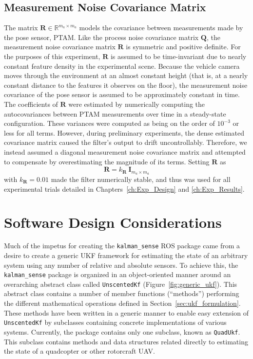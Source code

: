 \subsection{Measurement Noise Covariance Matrix} \label{sec:R_Matrix}

The matrix $\mathbf{R} \in \mathbb{R}^{m_{a} \times m_{a}}$ models the covariance between measurements made by the pose sensor, PTAM. Like the process noise covariance matrix $\mathbf{Q}$, the measurement noise covariance matrix $\mathbf{R}$ is symmetric and positive definite. For the purposes of this experiment, $\mathbf{R}$ is assumed to be time-invariant due to nearly constant feature density in the experimental scene. Because the vehicle camera moves through the environment at an almost constant height (that is, at a nearly constant distance to the features it observes on the floor), the measurement noise covariance of the pose sensor is assumed to be approximately constant in time. The coefficients of $\mathbf{R}$ were estimated by numerically computing the autocovariances between PTAM measurements over time in a steady-state configuration. These variances were computed as being on the order of $10^{-3}$ or less for all terms. However, during preliminary experiments, the dense estimated covariance matrix caused the filter's output to drift uncontrollably. Therefore, we instead assumed a diagonal measurement noise covariance matrix and attempted to compensate by overestimating the magnitude of its terms. Setting $\mathbf{R}$ as
%
\begin{equation}
\mathbf{R} = k_{\mathbf{R}}\ \mathbf{I}_{m_{a} \times m_{a}}
\end{equation}
%
with $k_{\mathbf{R}} = 0.01$ made the filter numerically stable, and thus was used for all experimental trials detailed in Chapters~\ref{ch:Exp_Design} and \ref{ch:Exp_Results}.

\section{Software Design Considerations}

Much of the impetus for creating the \texttt{kalman\_sense} ROS package came from a desire to create a generic UKF framework for estimating the state of an arbitrary system using any number of relative and absolute sensors. To achieve this, the \texttt{kalman\_sense} package is organized in an object-oriented manner around an overarching abstract class called \texttt{UnscentedKf} (Figure~\ref{fig:generic_ukf}). This abstract class contains a number of member functions (``methods'') performing the different mathematical operations defined in Section~\ref{sec:ukf_formulation}. These methods have been written in a generic manner to enable easy extension of \texttt{UnscentedKf} by subclasses containing concrete implementations of various systems. Currently, the package contains only one subclass, known as \texttt{QuadUkf}. This subclass contains methods and data structures related directly to estimating the state of a quadcopter or other rotorcraft UAV.

